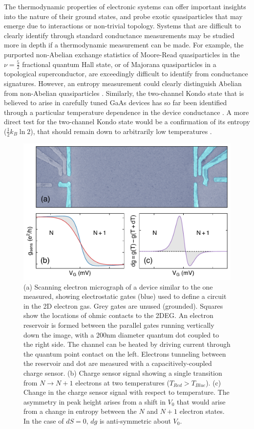 \documentclass[twocolumn,showpacs,preprintnumbers,amsmath,amssymb,pra,aps,superscriptaddress]{revtex4-1}
\begin{document}
The thermodynamic properties of electronic systems can offer important insights into the nature of their ground states, and probe exotic quasiparticles that may emerge due to interactions or non-trivial topology.  Systems that are difficult to clearly identify through standard conductance measurements may be studied more in depth if a thermodynamic measurement can be made. For example, the purported non-Abelian exchange statistics of Moore-Read quasiparticles in the $\nu = \frac{5}{2}$ fractional quantum Hall state, or of Majorana quasiparticles in a topological superconductor, are exceedingly difficult to identify from conductance signatures. However, an entropy measurement could clearly distinguish Abelian from non-Abelian quasiparticles \cite{Cooper2009, Smirnov2015}.  Similarly, the two-channel Kondo state that is believed to arise in carefully tuned GaAs devices has so far been identified through a particular temperature dependence in the device conductance \cite{Potok2007}. A more direct test for the two-channel Kondo state would be a confirmation of its entropy ($\frac{1}{2} k_B \ln{2}$), that should remain down to arbitrarily low temperatures \cite{Alkurtass2016}.

\begin{figure}[!]
        \includegraphics[width=1.0\columnwidth]{../figures/figure_1_no-annotation.pdf}
        \caption{\label{fig:fig1}(a) Scanning electron micrograph of a device similar to the one measured, showing electrostatic gates (blue) used to define a circuit in the 2D electron gas. Grey gates are unused (grounded). Squares show the locations of ohmic contacts to the 2DEG. An electron reservoir is formed between the parallel gates running vertically down the image, with a 200nm diameter quantum dot coupled to the right side. The channel can be heated by driving current through the quantum point contact on the left. Electrons tunneling between the reservoir and dot are measured with a capacitively-coupled charge sensor. (b)  Charge sensor signal showing a single transition from $N \rightarrow N+1$ electrons at two temperatures ($T_{Red} > T_{Blue}$). (c) Change in the charge sensor signal with respect to temperature. The asymmetry in peak height arises from a shift in $V_0$ that would arise from a change in entropy between the $N$ and $N+1$ electron states. In the case of $dS=0$, $dg$ is anti-symmetric about $V_0$.}
\end{figure}
\end{document}
